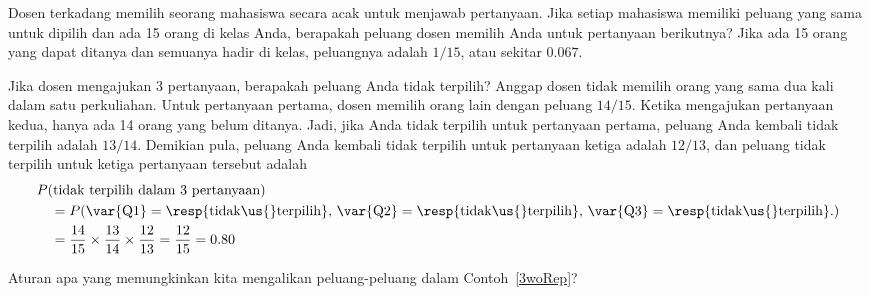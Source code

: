 \begin{examplewrap}
\begin{nexample}{Dosen terkadang memilih seorang mahasiswa secara acak untuk menjawab pertanyaan. Jika setiap mahasiswa memiliki peluang yang sama untuk dipilih dan ada 15 orang di kelas Anda, berapakah peluang dosen memilih Anda untuk pertanyaan berikutnya?}
Jika ada 15 orang yang dapat ditanya dan semuanya hadir di kelas, peluangnya adalah $1/15$, atau sekitar $0.067$.
\end{nexample}
\end{examplewrap}

\begin{examplewrap}
\begin{nexample}{Jika dosen mengajukan 3 pertanyaan, berapakah peluang Anda tidak terpilih? Anggap dosen tidak memilih orang yang sama dua kali dalam satu perkuliahan.}\label{3woRep}
Untuk pertanyaan pertama, dosen memilih orang lain dengan peluang $14/15$. Ketika mengajukan pertanyaan kedua, hanya ada 14 orang yang belum ditanya. Jadi, jika Anda tidak terpilih untuk pertanyaan pertama, peluang Anda kembali tidak terpilih adalah $13/14$. Demikian pula, peluang Anda kembali tidak terpilih untuk pertanyaan ketiga adalah $12/13$, dan peluang tidak terpilih untuk ketiga pertanyaan tersebut adalah
\begin{align*}
&P(\text{tidak terpilih dalam 3 pertanyaan}) \\
&\quad = P(\text{\var{Q1}} = \text{\resp{tidak\us{}terpilih}, }\text{\var{Q2}} = \text{\resp{tidak\us{}terpilih}, }\text{\var{Q3}} = \text{\resp{tidak\us{}terpilih}.}) \\
&\quad = \frac{14}{15}\times\frac{13}{14}\times\frac{12}{13} = \frac{12}{15} = 0.80
\end{align*}
\end{nexample}
\end{examplewrap}

\begin{exercisewrap}
\begin{nexercise}
Aturan apa yang memungkinkan kita mengalikan peluang-peluang dalam Contoh~\ref{3woRep}?\footnotemark
\end{nexercise}
\end{exercisewrap}


